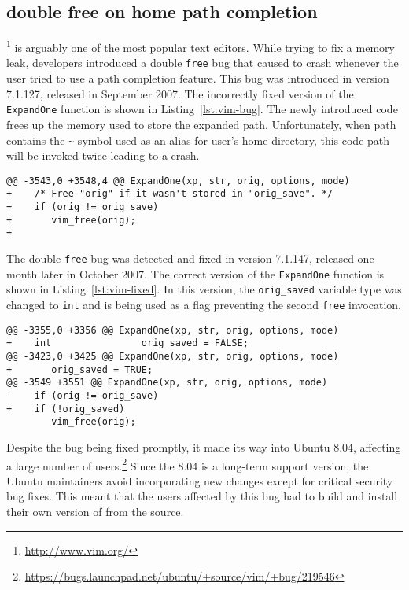 \subsection{\vim double free on home path completion}

\vim\footnote{\url{http://www.vim.org/}} is arguably one of the most popular
text editors. While trying to fix a memory leak, \vim developers introduced a
double \lstinline`free` bug that caused \vim to crash whenever the user tried to
use a path completion feature. This bug was introduced in version 7.1.127,
released in September 2007. The incorrectly fixed version of the
\lstinline`ExpandOne` function is shown in Listing~\ref{lst:vim-bug}. The newly
introduced code frees up the memory used to store the expanded path.
Unfortunately, when path contains the \lstinline`~` symbol used as an alias for
user's home directory, this code path will be invoked twice leading to a crash.

\begin{lstlisting}[alsolanguage=diff,numbers=none,label=lst:vim-bug,caption={First (incorrect) fix of \lstinline`ExpandOne` function in \vim.}]
@@ -3543,0 +3548,4 @@ ExpandOne(xp, str, orig, options, mode)
+    /* Free "orig" if it wasn't stored in "orig_save". */
+    if (orig != orig_save)
+       vim_free(orig);
+
\end{lstlisting}

The double \lstinline`free` bug was detected and fixed in version 7.1.147, released
one month later in October 2007. The correct version of the \lstinline`ExpandOne`
function is shown in Listing~\ref{lst:vim-fixed}. In this version, the
\lstinline`orig_saved` variable type was changed to \lstinline`int` and is
being used as a flag preventing the second \lstinline`free` invocation.

\begin{lstlisting}[alsolanguage=diff,numbers=none,label=lst:vim-fixed,caption={Second (correct) fix \lstinline`ExpandOne` function in \vim.}]
@@ -3355,0 +3356 @@ ExpandOne(xp, str, orig, options, mode)
+    int                orig_saved = FALSE;
@@ -3423,0 +3425 @@ ExpandOne(xp, str, orig, options, mode)
+       orig_saved = TRUE;
@@ -3549 +3551 @@ ExpandOne(xp, str, orig, options, mode)
-    if (orig != orig_save)
+    if (!orig_saved)
        vim_free(orig);
\end{lstlisting}

Despite the bug being fixed promptly, it made its way into Ubuntu 8.04,
affecting a large number of
users.\footnote{\url{https://bugs.launchpad.net/ubuntu/+source/vim/+bug/219546}}
Since the 8.04 is a long-term support version, the Ubuntu maintainers avoid
incorporating new changes except for critical security bug fixes. This meant
that the \vim users affected by this bug had to build and install their own
version of \vim from the source.

